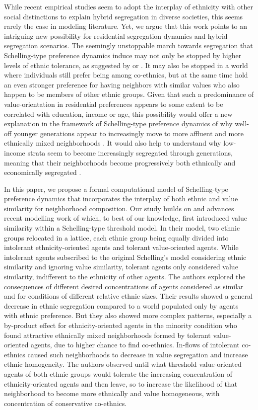 \documentclass[
]{article}
\begin{document}
While recent empirical studies seem to adopt the interplay of ethnicity
with other social distinctions to explain hybrid segregation in diverse
societies, this seems rarely the case in modeling literature. Yet, we
argue that this work points to an intriguing new possibility for
residential segregation dynamics and hybrid segregation scenarios. The
seemingly unstoppable march towards segregation that Schelling-type
preference dynamics induce may not only be stopped by higher levels of
ethnic tolerance, as suggested by \cite{xie2012modeling} or
\cite{hatna2014combining}. It may also be stopped in a world where
individuals still prefer being among co-ethnics, but at the same time
hold an even stronger preference for having neighbors with similar
values who also happen to be members of other ethnic groups. Given that
such a predominance of value-orientation in residential preferences
appears to some extent to be correlated with education, income or age,
this possibility would offer a new explanation in the framework of
Schelling-type preference dynamics of why well-off younger generations
appear to increasingly move to more affluent and more ethnically mixed
neighborhoods \citep{clark2018can,clark2002residential}. It would also
help to understand why low-income strata seem to become increasingly
segregated through generations, meaning that their neighborhoods become
progressively both ethnically and economically segregated
\citep{clark2002residential}.

In this paper, we propose a formal computational model of Schelling-type
preference dynamics that incorporates the interplay of both ethnic and
value similarity for neighborhood composition. Our study builds on and
advances recent modelling work of \cite{paolillo2018} which, to best of
our knowledge, first introduced value similarity within a Schelling-type
threshold model. In their model, two ethnic groups relocated in a
lattice, each ethnic group being equally divided into intolerant
ethnicity-oriented agents and tolerant value-oriented agents. While
intolerant agents subscribed to the original Schelling's model
considering ethnic similarity and ignoring value similarity, tolerant
agents only considered value similarity, indifferent to the ethnicity of
other agents. The authors explored the consequences of different desired
concentrations of agents considered as similar and for conditions of
different relative ethnic sizes. Their results showed a general decrease
in ethnic segregation compared to a world populated only by agents with
ethnic preference. But they also showed more complex patterns,
especially a by-product effect for ethnicity-oriented agents in the
minority condition who found attractive ethnically mixed neighborhoods
formed by tolerant value-oriented agents, due to higher chance to find
co-ethnics. In-flows of intolerant co-ethnics caused such neighborhoods
to decrease in value segregation and increase ethnic homogeneity. The
authors observed until what threshold value-oriented agents of both
ethnic groups would tolerate the increasing concentration of
ethnicity-oriented agents and then leave, so to increase the likelihood
of that neighborhood to become more ethnically and value homogeneous,
with concentration of conservative co-ethnics.
\end{document}
